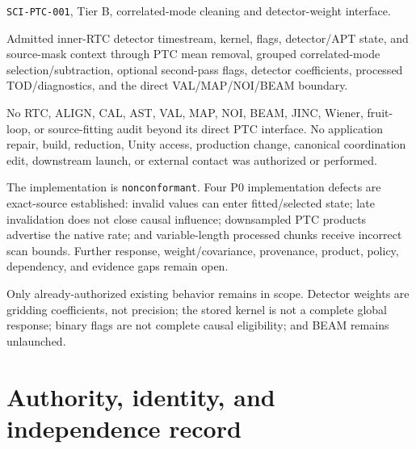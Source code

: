 \documentclass[11pt]{article}
\newcommand{\code}[1]{\nolinkurl{#1}}
\begin{document}
\begin{description}[style=nextline,leftmargin=0pt]
\item[Package and tier]
\code{SCI-PTC-001}, Tier B, correlated-mode cleaning and detector-weight
interface.
\item[Included transformation]
Admitted inner-RTC detector timestream, kernel, flags, detector/APT state, and
source-mask context through PTC mean removal, grouped correlated-mode
selection/subtraction, optional second-pass flags, detector coefficients,
processed TOD/diagnostics, and the direct VAL/MAP/NOI/BEAM boundary.
\item[Explicit exclusions]
No RTC, ALIGN, CAL, AST, VAL, MAP, NOI, BEAM, JINC, Wiener, fruit-loop, or
source-fitting audit beyond its direct PTC interface.  No application repair,
build, reduction, Unity access, production change, canonical coordination
edit, downstream launch, or external contact was authorized or performed.
\item[Strongest supported result]
The implementation is \texttt{nonconformant}.  Four P0 implementation defects
are exact-source established: invalid values can enter fitted/selected state;
late invalidation does not close causal influence; downsampled PTC products
advertise the native rate; and variable-length processed chunks receive
incorrect scan bounds.  Further response, weight/covariance, provenance,
product, policy, dependency, and evidence gaps remain open.
\item[Consumer policy]
Only already-authorized existing behavior remains in scope.  Detector weights
are gridding coefficients, not precision; the stored kernel is not a complete
global response; binary flags are not complete causal eligibility; and BEAM
remains unlaunched.
\end{description}

\section{Authority, identity, and independence record}
\end{document}
